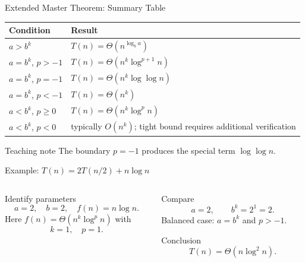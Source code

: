 \documentclass[aspectratio=169]{beamer}
\begin{document}
\begin{frame}{Extended Master Theorem: Summary Table}
  \scriptsize
  \begin{center}
    \renewcommand{\arraystretch}{1.25}
    \begin{tabular}{L{0.31\textwidth}L{0.46\textwidth}}
      \toprule
      \textbf{Condition} & \textbf{Result} \\
      \midrule
      $a>b^k$ & $T(n)=\Theta\!\left(n^{\log_b a}\right)$ \\
      \addlinespace
      $a=b^k$, $p>-1$ & $T(n)=\Theta\!\left(n^k\log^{p+1}n\right)$ \\
      \addlinespace
      $a=b^k$, $p=-1$ & $T(n)=\Theta\!\left(n^k\log\log n\right)$ \\
      \addlinespace
      $a=b^k$, $p<-1$ & $T(n)=\Theta(n^k)$ \\
      \addlinespace
      $a<b^k$, $p\ge 0$ & $T(n)=\Theta\!\left(n^k\log^p n\right)$ \\
      \addlinespace
      $a<b^k$, $p<0$ & typically $O(n^k)$; tight bound requires additional verification \\
      \bottomrule
    \end{tabular}
  \end{center}
  \begin{alertblock}{Teaching note}
    \centering\small
    The boundary $p=-1$ produces the special term $\log\log n$.
  \end{alertblock}
\end{frame}

\begin{frame}{Example: $T(n)=2T(n/2)+n\log n$}
  \small
  \begin{columns}[T]
    \begin{column}{0.50\textwidth}
      \begin{block}{Identify parameters}
        \[
          a=2,\quad b=2,\quad f(n)=n\log n.
        \]
        Here $f(n)=\Theta(n^k\log^p n)$ with
        \[
          k=1,\quad p=1.
        \]
      \end{block}
    \end{column}
    \begin{column}{0.46\textwidth}
      \begin{exampleblock}{Compare}
        \[
          a=2,\qquad b^k=2^1=2.
        \]
        Balanced case: $a=b^k$ and $p>-1$.
      \end{exampleblock}
      \begin{alertblock}{Conclusion}
        \[
          T(n)=\Theta(n\log^{2}n).
        \]
      \end{alertblock}
    \end{column}
  \end{columns}
\end{frame}
\end{document}

